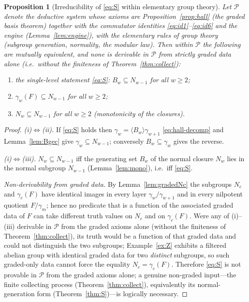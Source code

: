 \documentclass{amsart}
\newtheorem{proposition}{Proposition}
\theoremstyle{definition}
\theoremstyle{remark}
\begin{document}
\begin{proposition}[Irreducibility of \eqref{eq:S} within elementary group theory]
\label{prop:irreducible}
Let $\mathcal P$ denote the deductive system whose axioms are
Proposition~\ref{prop:hall} \textup{(the graded basis theorem)} together with the
commutator identities \eqref{eq:id1}--\eqref{eq:id6} and the engine
\textup{(Lemma~\ref{lem:engine})}, with the elementary rules of group theory
\textup{(subgroup generation, normality, the modular law)}. Then within $\mathcal P$
the following are mutually equivalent, and none is derivable in $\mathcal P$ from
strictly graded data alone \textup{(i.e.\ without the finiteness of
Theorem~\ref{thm:collect})}:
\begin{enumerate}
\item[\textup{(i)}] the single-level statement \eqref{eq:S}: $B_w\subseteq N_{w-1}$ for all $w\ge2$;
\item[\textup{(ii)}] $\gamma_w(F)\subseteq N_{w-1}$ for all $w\ge2$;
\item[\textup{(iii)}] $N_w\subseteq N_{w-1}$ for all $w\ge2$ \textup{(monotonicity of the closures)}.
\end{enumerate}
\end{proposition}
\begin{proof}
\emph{\textup{(i)}$\Leftrightarrow$\textup{(ii)}.} If \eqref{eq:S} holds then
$\gamma_w=\langle B_w\rangle\gamma_{w+1}$ \eqref{eq:hall-decomp} and
Lemma~\ref{lem:Bgec} give $\gamma_w\subseteq N_{w-1}$; conversely
$B_w\subseteq\gamma_w$ gives the reverse.

\emph{\textup{(i)}$\Leftrightarrow$\textup{(iii)}.} $N_w\subseteq N_{w-1}$ iff the
generating set $B_w$ of the normal closure $N_w$ lies in the normal subgroup
$N_{w-1}$ (Lemma~\ref{lem:mono}), i.e.\ iff \eqref{eq:S}.

\emph{Non-derivability from graded data.} By Lemma~\ref{lem:gradedNc} the
subgroups $N_c$ and $\gamma_c(F)$ have identical images in every layer
$\gamma_w/\gamma_{w+1}$ and in every nilpotent quotient $F/\gamma_m$; hence no
predicate that is a function of the associated graded data of $F$ can take
different truth values on $N_c$ and on $\gamma_c(F)$. Were any of
\textup{(i)}--\textup{(iii)} derivable in $\mathcal P$ from the graded axioms alone
(without the finiteness of Theorem~\ref{thm:collect}), its truth would be a
function of that graded data and could not distinguish the two subgroups;
Example~\ref{ex:Z} exhibits a filtered abelian group with identical graded data for
two \emph{distinct} subgroups, so such graded-only data cannot force the equality
$N_c=\gamma_c(F)$. Therefore \eqref{eq:S} is not provable in $\mathcal P$ from the
graded axioms alone; a genuine non-graded input---the finite collecting process
(Theorem~\ref{thm:collect}), equivalently its normal-generation form
(Theorem~\ref{thm:S})---is logically necessary.
\end{proof}
\end{document}
